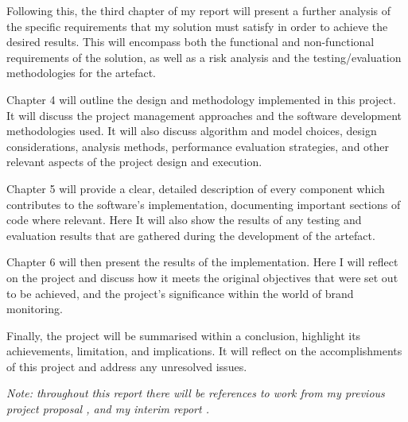 Following this, the third chapter of my report will present a further analysis of the specific requirements that my solution must satisfy in order to achieve the desired results. This will encompass both the functional and non-functional requirements of the solution, as well as a risk analysis and the testing/evaluation methodologies for the artefact.

Chapter 4 will outline the design and methodology implemented in this project. It will discuss the project management approaches and the software development methodologies used. It will also discuss algorithm and model choices, design considerations, analysis methods, performance evaluation strategies, and other relevant aspects of the project design and execution.

Chapter 5 will provide a clear, detailed description of every component which contributes to the software's implementation, documenting important sections of code where relevant. Here It will also show the results of any testing and evaluation results that are gathered during the development of the artefact.

Chapter 6 will then present the results of the implementation. Here I will reflect on the project and discuss how it meets the original objectives that were set out to be achieved, and the project's significance within the world of brand monitoring.

Finally, the project will be summarised within a conclusion, highlight its achievements, limitation, and implications. It will reflect on the accomplishments of this project and address any unresolved issues.

\textit{Note: throughout this report there will be references to work from my previous project proposal \citep{atkinson2023proposal}, and my interim report \citep{atkinson2024interim}.}
